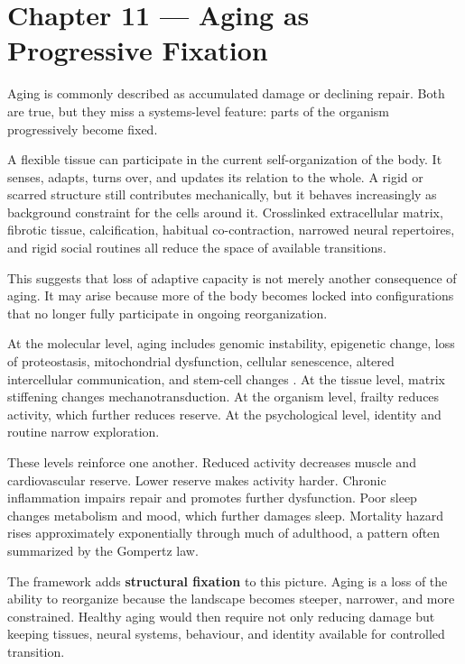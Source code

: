 \chapter{Chapter 11 --- Aging as Progressive Fixation}\label{chapter-11-aging-as-progressive-fixation}

Aging is commonly described as accumulated damage or declining repair. Both are true, but they miss a systems-level feature: parts of the organism progressively become fixed.

A flexible tissue can participate in the current self-organization of the body. It senses, adapts, turns over, and updates its relation to the whole. A rigid or scarred structure still contributes mechanically, but it behaves increasingly as background constraint for the cells around it. Crosslinked extracellular matrix, fibrotic tissue, calcification, habitual co-contraction, narrowed neural repertoires, and rigid social routines all reduce the space of available transitions.

This suggests that loss of adaptive capacity is not merely another consequence of aging. It may arise because more of the body becomes locked into configurations that no longer fully participate in ongoing reorganization.

At the molecular level, aging includes genomic instability, epigenetic change, loss of proteostasis, mitochondrial dysfunction, cellular senescence, altered intercellular communication, and stem-cell changes \autocite{lopezotin2023hallmarks}. At the tissue level, matrix stiffening changes mechanotransduction. At the organism level, frailty reduces activity, which further reduces reserve. At the psychological level, identity and routine narrow exploration.

These levels reinforce one another. Reduced activity decreases muscle and cardiovascular reserve. Lower reserve makes activity harder. Chronic inflammation impairs repair and promotes further dysfunction. Poor sleep changes metabolism and mood, which further damages sleep. Mortality hazard rises approximately exponentially through much of adulthood, a pattern often summarized by the Gompertz law.

The framework adds \textbf{structural fixation} to this picture. Aging is a loss of the ability to reorganize because the landscape becomes steeper, narrower, and more constrained. Healthy aging would then require not only reducing damage but keeping tissues, neural systems, behaviour, and identity available for controlled transition.

